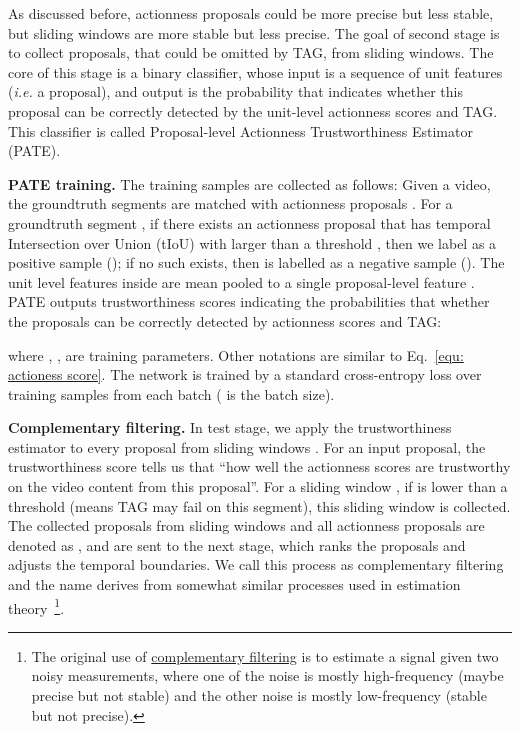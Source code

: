 \documentclass[runningheads]{llncs}
\begin{document}
As discussed before, actionness proposals could be more precise but less stable, but sliding windows are more stable but less precise. The goal of second stage is to collect proposals, that could be omitted by TAG, from sliding windows. The core of this stage is a binary classifier, whose input is a sequence of unit features (\emph{i.e.} a proposal), and output is the probability that indicates whether this proposal can be correctly detected by the unit-level actionness scores and TAG. This classifier is called Proposal-level Actionness Trustworthiness Estimator (PATE).

\textbf{PATE training.} The training samples are collected as follows: Given a video, the groundtruth segments  are matched with actionness proposals . For a groundtruth segment , if there exists an actionness proposal  that has temporal Intersection over Union (tIoU) with  larger than a threshold , then we label  as a positive sample (); if no such  exists, then  is labelled as a negative sample (). 
The unit level features inside  are mean pooled to a single proposal-level feature . 
PATE outputs trustworthiness scores indicating the probabilities that whether the proposals can be correctly detected by actionness scores and TAG:

where , ,  are training parameters. Other notations are similar to Eq.~\ref{equ: actioness score}. 
The network is trained by a standard cross-entropy loss over training samples from each batch ( is the batch size).


\textbf{Complementary filtering.} In test stage, we apply the trustworthiness estimator to every proposal from sliding windows . For an input proposal, the trustworthiness score  tells us that ``how well the actionness scores are trustworthy on the video content from this proposal''. For a sliding window , if  is lower than a threshold  (means TAG may fail on this segment), this sliding window is collected. The collected proposals from sliding windows and all actionness proposals are denoted as , and are sent to the next stage, which ranks the proposals and adjusts the temporal boundaries. We call this process as complementary filtering and the name derives from somewhat similar processes used in estimation theory~\footnote{The original use of \href{https://ocw.mit.edu/courses/aeronautics-and-astronautics/16-333-aircraft-stability-and-control-fall-2004/lecture-notes/lecture_15.pdf}{complementary filtering} is to estimate a signal given two noisy measurements, where one of the noise is mostly high-frequency (maybe precise but not stable) and the other noise is mostly low-frequency (stable but not precise).}.
\end{document}
